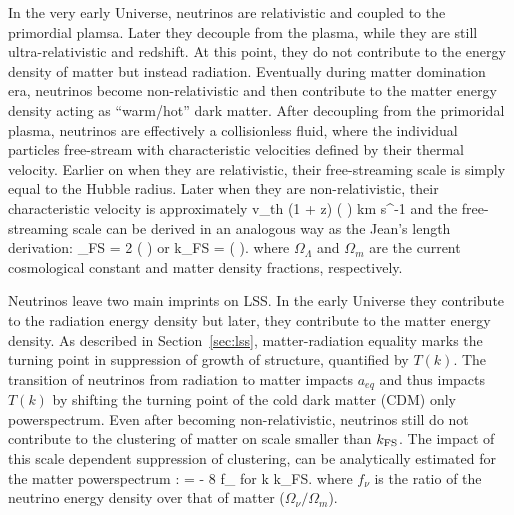 In the very early Universe, neutrinos are relativistic and coupled to the 
primordial plamsa. Later they decouple from the plasma, while they are still 
ultra-relativistic and redshift. At this point, they do not 
contribute to the energy density of matter but instead radiation. Eventually during 
matter domination era, neutrinos become non-relativistic and then contribute 
to the matter energy density acting as ``warm/hot'' dark matter.
After decoupling from the primoridal plasma, neutrinos are effectively a
collisionless fluid, where the individual particles free-stream with 
characteristic velocities defined by their thermal velocity. Earlier on 
when they are relativistic, their free-streaming scale is simply 
equal to the Hubble radius. Later when they are non-relativistic, 
their characteristic velocity is approximately  
\beq
v_{\rm th}  (1 + z) \left( \right) \; \; {\rm km \; s^{-1}}
\eeq
and the free-streaming scale can be derived in an analogous way as the 
Jean's length derivation: 
\beq
\lambda_{\rm FS} = 2 \pi {} \left(  \right)
\eeq
or 
\beq \label{eq:kfs}
k_{\rm FS} =    \left( \right).
\eeq
where $\Omega_\Lambda$ and $\Omega_m$ are the current cosmological constant and matter 
density fractions, respectively.

Neutrinos leave two main imprints on LSS. In the early Universe they contribute
to the radiation energy density but later, they contribute to the matter energy 
density. As described in 
Section~\ref{sec:lss}, matter-radiation equality marks the turning point in 
suppression of growth of structure, quantified by $T(k)$. The transition of 
neutrinos from radiation to matter impacts $a_{eq}$ and thus impacts $T(k)$ by 
shifting the turning point of the cold dark matter (CDM) only powerspectrum. 
Even after becoming non-relativistic, neutrinos still do not contribute to the
clustering of matter on scale smaller than $k_{\rm FS}$. The impact of this scale dependent 
suppression of clustering, can be analytically estimated for the matter powerspectrum 
\citep{Bird:2012aa}: 
\beq
{} =  \approx - 8 f_\nu \;\;\;\; {\rm for}\;\; k \gg k_{\rm FS}.
\eeq
where $f_\nu$ is the ratio of the neutrino energy density over that of matter 
($\Omega_\nu / \Omega_m$).

